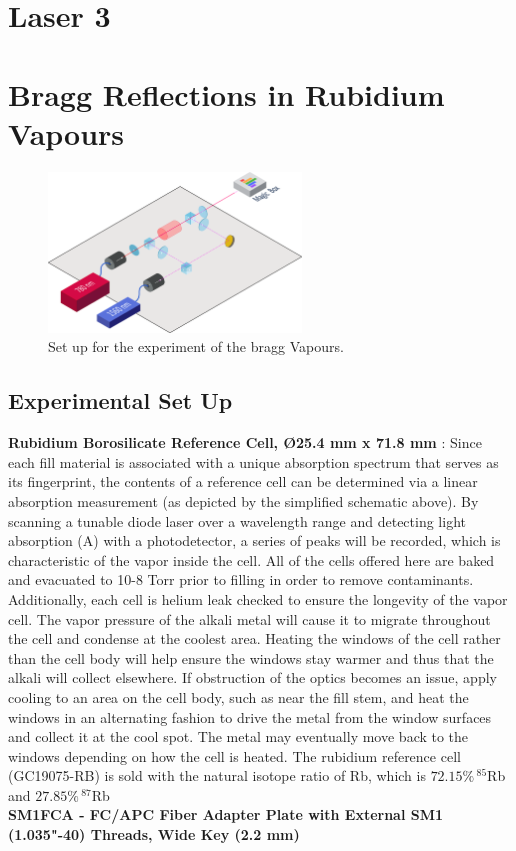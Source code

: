 \documentclass[10pt]{article}
\begin{document}
\section*{Laser 3}


\section*{Bragg Reflections in Rubidium Vapours}

\begin{figure}
    \centering
    \includegraphics[width=0.6\textwidth]{img/path16176.png}
    \caption{Set up for the experiment of the bragg Vapours.}
    \label{fig:braggref1}
\end{figure}






\subsection*{Experimental Set Up}
\textbf{Rubidium Borosilicate Reference Cell, Ø25.4 mm x 71.8 mm } :
Since each fill material is associated with a unique absorption spectrum that serves as its fingerprint, the contents of a reference cell can be determined via a linear absorption measurement (as depicted by the simplified schematic above). By scanning a tunable diode laser over a wavelength range and detecting light absorption (A) with a photodetector, a series of peaks will be recorded, which is characteristic of the vapor inside the cell.
All of the cells offered here are baked and evacuated to 10-8 Torr prior to filling in order to remove contaminants. Additionally, each cell is helium leak checked to ensure the longevity of the vapor cell. The vapor pressure of the alkali metal will cause it to migrate throughout the cell and condense at the coolest area. Heating the windows of the cell rather than the cell body will help ensure the windows stay warmer and thus that the alkali will collect elsewhere. If obstruction of the optics becomes an issue, apply cooling to an area on the cell body, such as near the fill stem, and heat the windows in an alternating fashion to drive the metal from the window surfaces and collect it at the cool spot. The metal may eventually move back to the windows depending on how the cell is heated.
The rubidium reference cell (GC19075-RB) is sold with the natural isotope ratio of Rb, which is $72.15\% \, ^{85}$Rb and $27.85\% \, ^{87}$Rb  \\
\textbf{SM1FCA - FC/APC Fiber Adapter Plate with External SM1 (1.035"-40) Threads, Wide Key (2.2 mm)}
\end{document}
